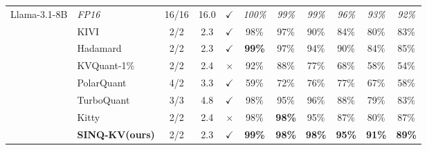 \documentclass{llmxive}
\providecommand{\ours}[1]{\cellcolor{customblue!30}#1}
\providecommand{\others}[1]{\cellcolor{gray!10}#1}
\providecommand{\methodname}{SINQ-KV\xspace}
\begin{document}
\begin{table}[t]
\begin{threeparttable}
\begin{tabular}{l l c c c c c c c c c}
\multirow{8}{*}{Llama-3.1-8B}
 & \textit{FP16} & 16/16 & 16.0 & $\checkmark$
   & \textit{100\%} & \textit{99\%} & \textit{99\%} & \textit{96\%} & \textit{93\%} & \textit{92\%} \\
\cmidrule(lr){2-11}
 & \others{KIVI} & \others{2/2} & \others{2.3} & \others{$\checkmark$} & \others{98\%} & \others{97\%} & \others{90\%} & \others{84\%} & \others{80\%} & \others{83\%} \\
 & \others{Hadamard} & \others{2/2} & \others{2.3} & \others{$\checkmark$} & \others{\textbf{99\%}} & \others{97\%} & \others{94\%} & \others{90\%} & \others{84\%} & \others{85\%} \\
 & \others{KVQuant-1\%} & \others{2/2} & \others{2.4} & \others{$\times$} & \others{92\%} & \others{88\%} & \others{77\%} & \others{68\%} & \others{58\%} & \others{54\%} \\
 & \others{PolarQuant} & \others{4/2} & \others{3.3} & \others{$\checkmark$} & \others{59\%} & \others{72\%} & \others{76\%} & \others{77\%} & \others{67\%} & \others{58\%} \\
 & \others{TurboQuant\tnote{1}} & \others{3/3} & \others{4.8} & \others{$\checkmark$} & \others{98\%} & \others{95\%} & \others{96\%} & \others{88\%} & \others{79\%} & \others{83\%} \\
 & \others{Kitty} & \others{2/2} & \others{2.4} & \others{$\times$} & \others{98\%} & \others{\textbf{98\%}} & \others{95\%} & \others{87\%} & \others{80\%} & \others{87\%} \\
 & \textbf{\ours{\methodname (ours)}} 
   & \ours{2/2} & \ours{2.3} & \ours{$\checkmark$}
   & \ours{\textbf{99\%}} & \ours{\textbf{98\%}} & \ours{\textbf{98\%}} & \ours{\textbf{95\%}} & \ours{\textbf{91\%}} & \ours{\textbf{89\%}} \\

\midrule


\end{tabular}
\end{threeparttable}
\end{table}
\end{document}
